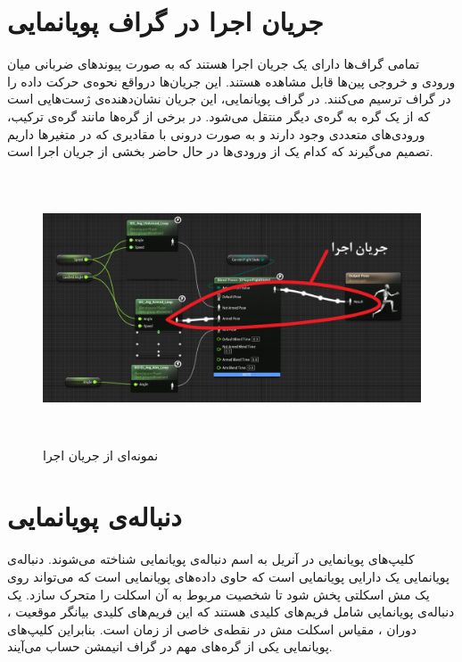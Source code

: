 \section{جریان اجرا در گراف پویانمایی}

تمامی گراف‌ها دارای یک جریان اجرا هستند که به صورت پیوند‌های ضربانی 
میان ورودی و خروجی پین‌ها قابل مشاهده هستند. این جریان‌ها درواقع نحوه‌ی حرکت داده
را در گراف ترسیم می‌کنند.
در گراف پویانمایی، این جریان نشان‌دهنده‌ی ‌ژست‌هایی است که از 
یک گره به گره‌ی دیگر منتقل می‌شود.
در برخی از گره‌‌ها مانند گره‌ی ترکیب، ورودی‌های متعددی وجود دارند و به صورت 
درونی با مقادیری که در متغیر‌ها داریم تصمیم می‌گیرند که کدام یک از ورودی‌‌ها 
در حال حاضر بخشی از جریان اجرا است.


\begin{figure}[ht]
	\centerline{\includegraphics[width=\textwidth,height=8cm,keepaspectratio]{Figures/Ch3/ExecFlow.png}}

	\caption{نمونه‌ای از جریان اجرا}
	\label{fig:ExecFlow}
\end{figure}



\cite{AnimationGraphUnrealEngine}

\section {دنباله‌ی پویانمایی}

کلیپ‌های پویانمایی در آنریل به اسم دنباله‌ی پویانمایی شناخته می‌شوند.
دنباله‌ی پویانمایی یک دارایی پویانمایی است که 
حاوی داده‌‌های پویانمایی است که می‌تواند روی 
یک مش اسکلتی پخش شود تا شخصیت مربوط 
به آن اسکلت را متحرک سازد.
یک دنباله‌ی پویانمایی شامل فریم‌های کلیدی هستند که 
این فریم‌های کلیدی بیانگر موقعیت
، دوران 
، مقیاس
اسکلت مش در نقطه‌‌ی خاصی از زمان است.
بنابراین کلیپ‌های پویانمایی یکی از گره‌های مهم در 
گراف انیمشن حساب می‌آیند.

